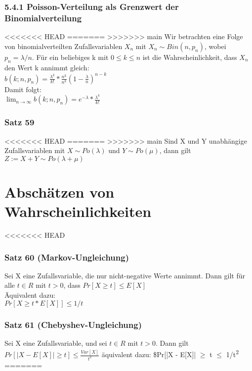 \documentclass[11pt]{article}
\begin{document}
\begin{enumerate}
\begin{enumerate}
{\begin{enumerate}
\begin{enumerate}
\begin{enumerate}
\subsubsection{5.4.1 Poisson-Verteilung als Grenzwert der Binomialverteilung}
<<<<<<< HEAD
\label{sec:org1b1eece}
=======
\label{sec:org9b85f0e}
>>>>>>> main
Wir betrachten eine Folge von binomialverteilten Zufallsvariablen \(X_n\) mit
\(X_n \sim Bin(n, p_n)\), wobei \(p_n = \lambda/n\). Für ein beliebiges k mit \(0 \leq k \leq n\) ist die Wahrscheinlichkeit, dass \(X_n\) den Wert k annimmt gleich: \\
\(b(k;n,p_n) = \frac{\lambda^k}{k!} * \frac{n^{\underline{k}}}{n^k} (1-\frac{\lambda}{n})^{n-k}\) \\
Damit folgt: \\
\(\lim_{n \rightarrow \infty} b(k;n,p_n) = e^{-\lambda} * \frac{\lambda^k}{k!}\)

\subsubsection{Satz 59}
<<<<<<< HEAD
\label{sec:orgabb5d78}
=======
\label{sec:org8ebd927}
>>>>>>> main
Sind X und Y unabhängige Zufallsvariablen mit \(X \sim Po(\lambda)\) und \(Y \sim Po(\mu)\), dann gilt \\
\(Z := X + Y  \sim Po(\lambda + \mu)\)

\section{Abschätzen von Wahrscheinlichkeiten}
<<<<<<< HEAD
\label{sec:org21ad83b}
\subsubsection{Satz 60 (Markov-Ungleichung)}
\label{sec:orgd3a0a3e}
Sei X eine Zufallsvariable, die nur nicht-negative Werte annimmt. Dann gilt für alle \(t \in R\) mit \(t > 0\), dass \(Pr[X \geq t] \leq E[X]\) \\
Äquivalent dazu: \\
\(Pr[X \geq t * E[X]] \leq 1/t\)
\subsubsection{Satz 61 (Chebyshev-Ungleichung)}
\label{sec:org56ea577}
Sei X eine Zufallsvariable, und sei \(t \in R\) mit \(t > 0\). Dann gilt \\
\(Pr[|X - E[X]| \geq t] \leq \frac{Var[X]}{t^2}\)
äquivalent dazu:
\$Pr[|X - E[X]| \(\ge\) t \(\le\) 1/t\textsuperscript{2}
=======
\label{sec:org0c01e52}

\end{enumerate}
\end{enumerate}
\end{enumerate}}
\end{enumerate}
\end{enumerate}
\end{document}
